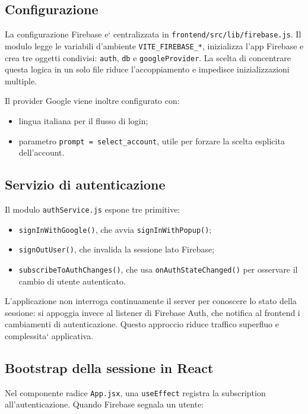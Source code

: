 \documentclass[11pt,a4paper]{article}
\begin{document}
\subsection{Configurazione}

La configurazione Firebase e` centralizzata in \texttt{frontend/src/lib/firebase.js}. Il modulo legge le variabili d'ambiente \texttt{VITE\_FIREBASE\_*}, inizializza l'app Firebase e crea tre oggetti condivisi: \texttt{auth}, \texttt{db} e \texttt{googleProvider}. La scelta di concentrare questa logica in un solo file riduce l'accoppiamento e impedisce inizializzazioni multiple.

Il provider Google viene inoltre configurato con:

\begin{itemize}
  \item lingua italiana per il flusso di login;
  \item parametro \texttt{prompt = select\_account}, utile per forzare la scelta esplicita dell'account.
\end{itemize}

\subsection{Servizio di autenticazione}

Il modulo \texttt{authService.js} espone tre primitive:

\begin{itemize}
  \item \texttt{signInWithGoogle()}, che avvia \texttt{signInWithPopup()};
  \item \texttt{signOutUser()}, che invalida la sessione lato Firebase;
  \item \texttt{subscribeToAuthChanges()}, che usa \texttt{onAuthStateChanged()} per osservare il cambio di utente autenticato.
\end{itemize}

L'applicazione non interroga continuamente il server per conoscere lo stato della sessione: si appoggia invece al listener di Firebase Auth, che notifica al frontend i cambiamenti di autenticazione. Questo approccio riduce traffico superfluo e complessita` applicativa.

\subsection{Bootstrap della sessione in React}

Nel componente radice \texttt{App.jsx}, una \texttt{useEffect} registra la subscription all'autenticazione. Quando Firebase segnala un utente:
\end{document}
